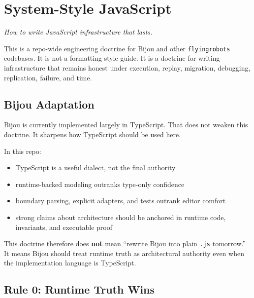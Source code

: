 \chapter{System-Style JavaScript}\label{record-060}

\smallskip

\emph{How to write JavaScript infrastructure that lasts.}

This is a repo-wide engineering doctrine for Bijou and other \texttt{f\allowbreak{}l\allowbreak{}y\allowbreak{}i\allowbreak{}n\allowbreak{}g\allowbreak{}r\allowbreak{}o\allowbreak{}b\allowbreak{}o\allowbreak{}t\allowbreak{}s} codebases. It is not a formatting style guide. It is a doctrine for writing infrastructure that remains honest under execution, replay, migration, debugging, replication, failure, and time.

\section{Bijou Adaptation}\label{record-060-bijou-adaptation}

Bijou is currently implemented largely in TypeScript. That does not weaken this doctrine. It sharpens how TypeScript should be used here.

In this repo:

\begin{itemize}
\tightlist
\item
  TypeScript is a useful dialect, not the final authority
\item
  runtime-backed modeling outranks type-only confidence
\item
  boundary parsing, explicit adapters, and tests outrank editor comfort
\item
  strong claims about architecture should be anchored in runtime code, invariants, and executable proof
\end{itemize}

This doctrine therefore does \textbf{not} mean ``rewrite Bijou into plain \texttt{.\allowbreak{}j\allowbreak{}s} tomorrow.'' It means Bijou should treat runtime truth as architectural authority even when the implementation language is TypeScript.

\section{Rule 0: Runtime Truth Wins}\label{record-060-rule-0-runtime-truth-wins}

